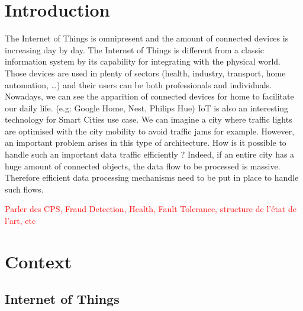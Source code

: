 \documentclass[11pt]{article}
\begin{document}

\section{Introduction}

The Internet of Things is omnipresent and the amount of connected devices is increasing day by day.
The Internet of Things is different from a classic information system by its capability for integrating with the physical world.
Those devices are used in plenty of sectors (health, industry, transport, home automation, \ldots) and their users can be both professionals and individuals.
Nowadays, we can see the apparition of connected devices for home to facilitate our daily life. (e.g: Google Home, Nest, Philips Hue)
IoT is also an interesting technology for Smart Cities use case.
We can imagine a city where traffic lights are optimised with the city mobility to avoid traffic jams for example.
However, an important problem arises in this type of architecture.
How is it possible to handle such an important data traffic efficiently ?
Indeed, if an entire city has a huge amount of connected objects, the data flow to be processed is massive.
Therefore efficient data processing mechanisms need to be put in place to handle such flows.


\textcolor{red}{Parler des CPS, Fraud Detection, Health, Fault Tolerance, structure de l'état de l'art, etc}
\newpage

\section{Context}

\subsection{Internet of Things}
\end{document}

